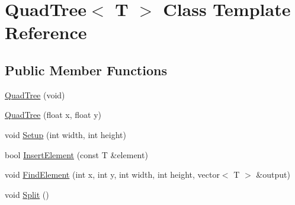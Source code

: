 \hypertarget{class_quad_tree}{\section{Quad\-Tree$<$ T $>$ Class Template Reference}
\label{class_quad_tree}
}
\subsection*{Public Member Functions}
\begin{DoxyCompactItemize}
\item 
\hyperlink{class_quad_tree_ab99b17f847081ca3e32347480f6dfed1}{Quad\-Tree} (void)
\item 
\hyperlink{class_quad_tree_aa04baf2df55240abaca6e414436a6a76}{Quad\-Tree} (float x, float y)
\item 
void \hyperlink{class_quad_tree_a22f7b8e8eaf730189559c8813338544e}{Setup} (int width, int height)
\item 
bool \hyperlink{class_quad_tree_acf5ee45d199e62fca950366a2e20f700}{Insert\-Element} (const T \&element)
\item 
void \hyperlink{class_quad_tree_a8d8050ecd639393b02a75bf4eea8f7ae}{Find\-Element} (int x, int y, int width, int height, vector$<$ T $>$ \&output)
\item 
void \hyperlink{class_quad_tree_a481c6a515cb97fa75b52253dc0ab106a}{Split} ()
\end{DoxyCompactItemize}
